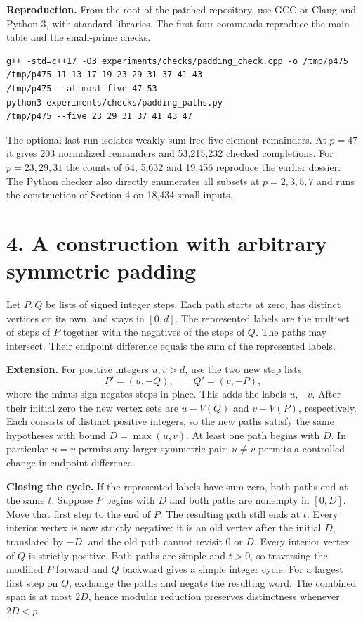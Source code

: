 \documentclass[11pt]{article}
\newcommand{\sect}[1]{\section*{\color{ink}#1}}
\begin{document}
\textbf{Reproduction.} From the root of the patched repository, use GCC or Clang and Python 3, with standard libraries. The first four commands reproduce the main table and the small-prime checks.
\begin{verbatim}
g++ -std=c++17 -O3 experiments/checks/padding_check.cpp -o /tmp/p475
/tmp/p475 11 13 17 19 23 29 31 37 41 43
/tmp/p475 --at-most-five 47 53
python3 experiments/checks/padding_paths.py
/tmp/p475 --five 23 29 31 37 41 43 47
\end{verbatim}
The optional last run isolates weakly sum-free five-element remainders. At $p=47$ it gives 203 normalized remainders and 53,215,232 checked completions. For $p=23,29,31$ the counts of 64, 5,632 and 19,456 reproduce the earlier dossier. The Python checker also directly enumerates all subsets at $p=2,3,5,7$ and runs the construction of Section 4 on 18,434 small inputs.
\newpage
\sect{4. A construction with arbitrary symmetric padding}
Let $P,Q$ be lists of signed integer steps. Each path starts at zero, has distinct vertices on its own, and stays in $[0,d]$. The represented labels are the multiset of steps of $P$ together with the negatives of the steps of $Q$. The paths may intersect. Their endpoint difference equals the sum of the represented labels.

\textbf{Extension.} For positive integers $u,v>d$, use the two new step lists
\[
        P'=(u,-Q),\qquad Q'=(v,-P),
\]
where the minus sign negates steps in place. This adds the labels $u,-v$. After their initial zero the new vertex sets are $u-V(Q)$ and $v-V(P)$, respectively. Each consists of distinct positive integers, so the new paths satisfy the same hypotheses with bound $D=\max(u,v)$. At least one path begins with $D$. In particular $u=v$ permits any larger symmetric pair; $u\ne v$ permits a controlled change in endpoint difference.

\textbf{Closing the cycle.} If the represented labels have sum zero, both paths end at the same $t$. Suppose $P$ begins with $D$ and both paths are nonempty in $[0,D]$. Move that first step to the end of $P$. The resulting path still ends at $t$. Every interior vertex is now strictly negative: it is an old vertex after the initial $D$, translated by $-D$, and the old path cannot revisit $0$ or $D$. Every interior vertex of $Q$ is strictly positive. Both paths are simple and $t>0$, so traversing the modified $P$ forward and $Q$ backward gives a simple integer cycle. For a largest first step on $Q$, exchange the paths and negate the resulting word. The combined span is at most $2D$, hence modular reduction preserves distinctness whenever $2D<p$.
\end{document}
